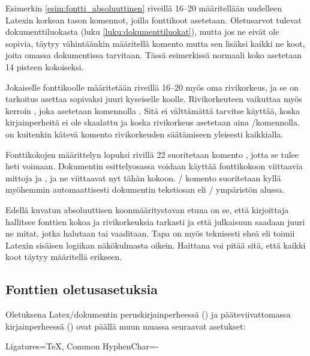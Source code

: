 \begin{koodilohkosis}
\sffamilyabs\Large\bfseries
\end{koodilohkosis}

Esimerkin \ref{esim:fontti_absoluuttinen} riveillä 16--20 määritellään
uudelleen Latexin korkean tason komennot, joilla fonttikoot asetetaan.
Oletusarvot tulevat dokumenttiluokasta (luku
\ref{luku:dokumenttiluokat}), mutta jos ne eivät ole sopivia, täytyy
vähintäänkin määritellä komento  mutta sen lisäksi
kaikki ne koot, joita omassa dokumentissa tarvitaan. Tässä esimerkissä
normaali koko asetetaan 14 pisteen kokoiseksi.

Jokaiselle fonttikoolle määritetään riveillä 16--20 myös oma
rivikorkeus, ja se on tarkoitus asettaa sopivaksi juuri kyseiselle
koolle. Rivikorkeuteen vaikuttaa myös kerroin ,
joka asetetaan komennolla . Sitä ei välttämättä
tarvitse käyttää, koska kirjainperheitä ei ole skaalattu ja koska
rivikorkeus asetetaan aina \-/komennolla.
 on kuitenkin kätevä komento rivikorkeuden
säätämiseen yleisesti kaikkialla.

Fonttikokojen määrittelyn lopuksi rivillä 22 suoritetaan komento
, jotta se tulee heti voimaan. Dokumentin
esittelyosassa voidaan käyttää fonttikokoon viittaavia mittoja
 ja , ja ne viittaavat nyt tähän kokoon.
\-/ komento suoritetaan kyllä myöhemmin
automaattisesti dokumentin tekstiosan eli \-/
ympäristön alussa.

Edellä kuvatun absoluuttisen koonmääritystavan etuna on se, että
kirjoittaja hallitsee fonttien kokoa ja rivikorkeuksia tarkasti ja että
julkaisuun saadaan juuri ne mitat, jotka halutaan tai vaaditaan. Tapa on
myös teknisesti eheä eli toimii Latexin sisäisen logiikan näkökulmasta
oikein. Haittana voi pitää sitä, että kaikki koot täytyy määritellä
erikseen.

\subsection{Fonttien oletusasetuksia}
\label{luku:fontit_oletusasetukset}

Oletuksena Latex\-/dokumentin peruskirjainperheessä
() ja pääteviivattomassa kirjainperheessä
() ovat päällä muun muassa seuraavat asetukset:%

\begin{koodilohkosis}
Ligatures={TeX, Common}
HyphenChar={-}
\end{koodilohkosis}

